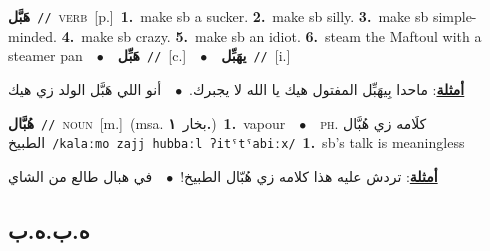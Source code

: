 \documentclass[10pt,a4paper,twoside]{article} %
\begin{document}
\begin{multicols}{2}
{\setlength\topsep{0pt}\textbf{\foreignlanguage{arabic}{هَبَّل}}\ {\color{gray}\texttt{//}\color{black}}\ \textsc{verb}\ [p.]\ \textbf{1.}~make sb a sucker.  \textbf{2.}~make sb silly.  \textbf{3.}~make sb simple-minded.  \textbf{4.}~make sb crazy.  \textbf{5.}~make sb an idiot.  \textbf{6.}~steam the Maftoul with a steamer pan\ \ $\bullet$\ \ \setlength\topsep{0pt}\textbf{\foreignlanguage{arabic}{هَبِّل}}\ {\color{gray}\texttt{//}\color{black}}\ [c.]\ \ $\bullet$\ \ \setlength\topsep{0pt}\textbf{\foreignlanguage{arabic}{يهَبِّل}}\ {\color{gray}\texttt{//}\color{black}}\ [i.]\  \begin{flushright}\color{gray}\foreignlanguage{arabic}{\textbf{\underline{\foreignlanguage{arabic}{أمثلة}}}: ماحدا بِيهَبِّل المفتول هيك يا الله لا يجبرك.\ $\bullet$\ \  أنو اللي هَبَّل الولد زي هيك}\end{flushright}\color{black}} \vspace{2mm}

{\setlength\topsep{0pt}\textbf{\foreignlanguage{arabic}{هُبَّال}}\ {\color{gray}\texttt{//}\color{black}}\ \textsc{noun}\ [m.]\ \color{gray}(msa. \foreignlanguage{arabic}{بخار}~\foreignlanguage{arabic}{\textbf{١.}})\color{black}\ \textbf{1.}~vapour\ \ $\bullet$\ \ \textsc{ph.} \color{gray} \foreignlanguage{arabic}{كلَامه زي هُبَّال الطبيخ}\color{black}\ {\color{gray}\texttt{/{\sffamily kalaːmo zajj hubbaːl ʔitˤtˤabiːx}/}\color{black}}\ \textbf{1.}~sb's talk is meaningless\  \begin{flushright}\color{gray}\foreignlanguage{arabic}{\textbf{\underline{\foreignlanguage{arabic}{أمثلة}}}: تردش عليه هذا كلامه زي هُبّال الطبيخ!\ $\bullet$\ \  في هبال طالع من الشاي}\end{flushright}\color{black}} \vspace{2mm}

\vspace{-3mm}
\subsection*{\color{blue}\foreignlanguage{arabic}{ه.ب.ه.ب}\color{blue}{}} 


\end{multicols}
\end{document}
